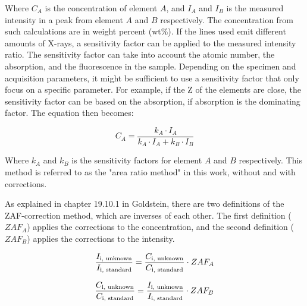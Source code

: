 Where $C_A$ is the concentration of element $A$, and $I_A$ and $I_B$ is the measured intensity in a peak from element $A$ and $B$ respectively.
The concentration from such calculations are in weight percent (wt\%).
If the lines used emit different amounts of X-rays, a sensitivity factor can be applied to the measured intensity ratio.
The sensitivity factor can take into account the atomic number, the absorption, and the fluorescence in the sample.
Depending on the specimen and acquisition parameters, it might be sufficient to use a sensitivity factor that only focus on a specific parameter.
For example, if the Z of the elements are close, the sensitivity factor can be based on the absorption, if absorption is the dominating factor.
The equation then becomes:

\begin{equation}
    \label{eq:theory:quantitative:area_ratio_corrected}
    C_A = \frac{k_A \cdot I_A}{k_A \cdot I_A + k_B \cdot I_B}
\end{equation}

Where $k_A$ and $k_B$ is the sensitivity factors for element $A$ and $B$ respectively.
This method is referred to as the "area ratio method" in this work, without and with corrections.





As explained in chapter 19.10.1 in Goldstein, there are two definitions of the ZAF-correction method, which are inverses of each other.
The first definition ($ZAF_A$) applies the corrections to the concentration, and the second definition ($ZAF_B$) applies the corrections to the intensity.


\begin{equation}
    \label{eq:theory:quantitative:zaf_a}
    \frac{I_\textnormal{i, unknown}}{I_\textnormal{i, standard}}  = \frac{C_\textnormal{i, unknown}}{C_\textnormal{i, standard}}\cdot ZAF_A
\end{equation}

\begin{equation}
    \label{eq:theory:quantitative:zaf_b}
    \frac{C_\textnormal{i, unknown}}{C_\textnormal{i, standard}} = \frac{I_\textnormal{i, unknown}}{I_\textnormal{i, standard}} \cdot ZAF_B
\end{equation}

